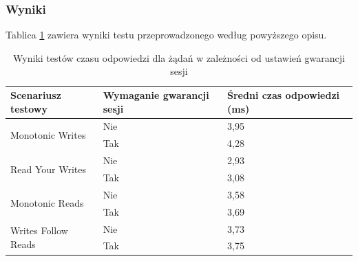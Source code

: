 \subsubsection*{Wyniki}


Tablica \ref{latencyresults} zawiera wyniki testu przeprowadzonego według powyższego opisu.

\begin{table}[]
\centering
\caption{Wyniki testów czasu odpowiedzi dla żądań w zależności od ustawień gwarancji sesji}
\label{latencyresults}
\begin{tabular}{@{}lll@{}}
\toprule
Scenariusz testowy                   & Wymaganie gwarancji sesji & Średni czas odpowiedzi (ms) \\ \midrule
\multirow{2}{*}{Monotonic Writes}    & Nie                       & 3,95                        \\
                                     & Tak                       & 4,28                        \\ \midrule
\multirow{2}{*}{Read Your Writes}    & Nie                       & 2,93                        \\
                                     & Tak                       & 3,08                        \\ \midrule
\multirow{2}{*}{Monotonic Reads}     & Nie                       & 3,58                        \\
                                     & Tak                       & 3,69                        \\ \midrule
\multirow{2}{*}{Writes Follow Reads} & Nie                       & 3,73                        \\
                                     & Tak                       & 3,75                        \\ \bottomrule
\end{tabular}
\end{table}


